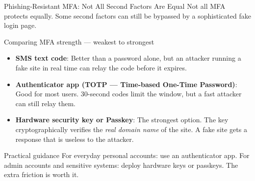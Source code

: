 \documentclass[aspectratio=169]{beamer}  %
\begin{document}
\begin{frame}{Phishing-Resistant MFA: Not All Second Factors Are Equal}
    \footnotesize
    Not all MFA protects equally. Some second factors can still be bypassed by a sophisticated fake login page.

    \vspace{0.4em}
    \begin{exampleblock}{Comparing MFA strength --- weakest to strongest}
        \footnotesize
        \begin{itemize}
            \item \textbf{SMS text code}: Better than a password alone, but an attacker running a fake site in real time can relay the code before it expires.
            \item \textbf{Authenticator app (TOTP --- Time-based One-Time Password)}: Good for most users. 30-second codes limit the window, but a fast attacker can still relay them.
            \item \textbf{Hardware security key or Passkey}: The strongest option. The key cryptographically verifies the \emph{real domain name} of the site. A fake site gets a response that is useless to the attacker.
        \end{itemize}
    \end{exampleblock}

    \begin{alertblock}{Practical guidance}
        \footnotesize
        For everyday personal accounts: use an authenticator app. For admin accounts and sensitive systems: deploy hardware keys or passkeys. The extra friction is worth it.
    \end{alertblock}
\end{frame}
\end{document}
